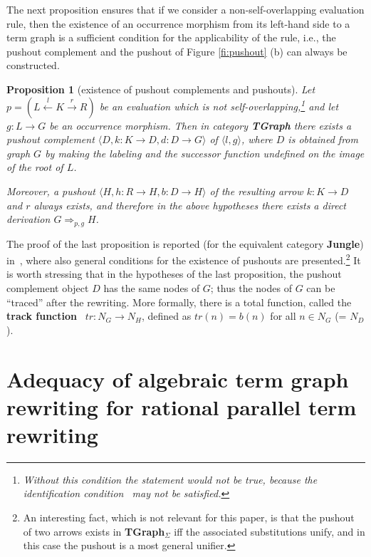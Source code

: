 \documentclass{eptcs}
\theoremstyle{plain}
\newtheorem{proposition}[theorem]{Proposition}
\theoremstyle{definition}
\begin{document}
The next proposition ensures that if we consider a 
non-self-overlapping  evaluation rule, then 
the existence of an occurrence morphism from its 
left-hand side to a term graph is a sufficient condition for the 
applicability of the rule, i.e., the pushout complement and the 
pushout 
of Figure \ref{fi:pushout} (b) can always be constructed.

\begin{proposition}
[existence of pushout complements and pushouts]
\label{pr:po-poc}
Let $p = (L \stackrel{l}{\leftarrow} K
\stackrel{r}{\rightarrow} R)$ be an evaluation which is not 
self-overlapping,\footnote{Without this condition the statement would 
not be true, because the {\em identification condition}~\cite{Ehr:TIAA} 
may not be satisfied.} and let $g: L 
\rightarrow G$ be an occurrence morphism. Then in category {\bf 
TGraph}
there exists a pushout complement $\langle  D, k:
K \rightarrow D, d: D \rightarrow G \rangle $
 of $\langle l, g\rangle$, where $D$ is 
obtained from graph $G$ by making the labeling and the successor 
function 
undefined on the image of the root of $L$. 

Moreover, a pushout $\langle H, h: R \rightarrow H, b: D \rightarrow H 
\rangle$ of the resulting arrow $k: K \rightarrow D$ and $r$ 
always exists, and therefore in the above hypotheses there exists a 
direct derivation $G \Rightarrow_{p,g} H$.
\end{proposition}



The proof of the last proposition is reported (for the equivalent 
category  {\bf Jungle}) in~\cite{CR:HRJR}, where also general conditions 
for the existence of pushouts are presented.\footnote{An interesting 
fact, which is not relevant for this paper, is that the pushout of two 
arrows exists in {\bf TGraph$_\Sigma$} iff the associated 
substitutions 
unify, and in this case the pushout is a most general unifier.} 
It is worth stressing that in the hypotheses of the last proposition,
the pushout 
complement object $D$ has the same nodes of $G$; thus the nodes of $G$ 
can be ``traced'' after the rewriting. More formally, there is a total 
function, called the {\bf track function\/}~\cite{HP:ITRJ} $tr: N_G 
\rightarrow N_H$,  
defined as $tr(n)=b(n)$ for all $n\in N_G$ (= $N_D$). 


\section{Adequacy of algebraic term graph rewriting for rational 
parallel term rewriting}
\label{se:adequacy}
\end{document}
